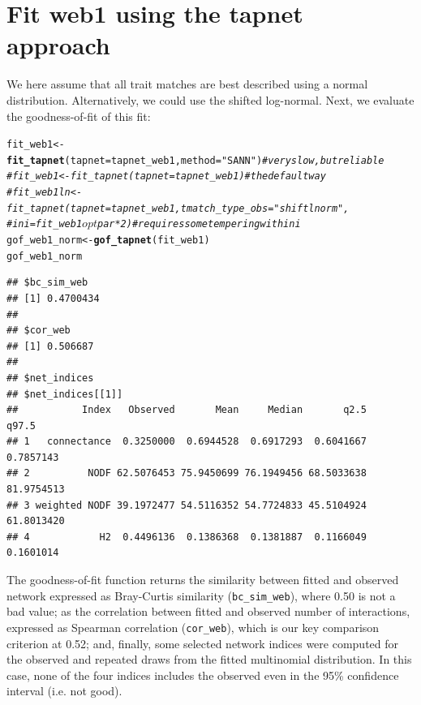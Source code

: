 \documentclass[a4paper, 11pt]{article}\usepackage[]{graphicx}\usepackage[]{color}
\makeatletter
\newcommand{\hlstr}[1]{\textcolor[rgb]{0.192,0.494,0.8}{#1}}%
\newcommand{\hlcom}[1]{\textcolor[rgb]{0.678,0.584,0.686}{\textit{#1}}}%
\newcommand{\hlstd}[1]{\textcolor[rgb]{0.345,0.345,0.345}{#1}}%
\newcommand{\hlkwb}[1]{\textcolor[rgb]{0.69,0.353,0.396}{#1}}%
\newcommand{\hlkwc}[1]{\textcolor[rgb]{0.333,0.667,0.333}{#1}}%
\newcommand{\hlkwd}[1]{\textcolor[rgb]{0.737,0.353,0.396}{\textbf{#1}}}%
\newenvironment{kframe}{%
 \def\at@end@of@kframe{}%
 \ifinner\ifhmode%
  \def\at@end@of@kframe{\end{minipage}}%
  \begin{minipage}{\columnwidth}%
 \fi\fi%
 \def\FrameCommand##1{\hskip\@totalleftmargin \hskip-\fboxsep
 \colorbox{shadecolor}{##1}\hskip-\fboxsep
     \hskip-\linewidth \hskip-\@totalleftmargin \hskip\columnwidth}%
 \MakeFramed {\advance\hsize-\width
   \@totalleftmargin\z@ \linewidth\hsize
   \@setminipage}}%
 {\par\unskip\endMakeFramed%
 \at@end@of@kframe}
\newenvironment{knitrout}{}{} %
\newcommand{\code}[1]{\texttt{#1}}
\makeatother
\begin{document}
\section{Fit web1 using the tapnet approach}
We here assume that all trait matches are best described using a normal distribution. Alternatively, we could use the shifted log-normal. Next, we evaluate the goodness-of-fit of this fit:
\begin{knitrout}\small
{}\color{fgcolor}\begin{kframe}
\begin{alltt}
\hlstd{fit_web1} \hlkwb{<-} \hlkwd{fit_tapnet}\hlstd{(}\hlkwc{tapnet} \hlstd{= tapnet_web1,} \hlkwc{method}\hlstd{=}\hlstr{"SANN"}\hlstd{)} \hlcom{# very slow, but reliable}
\hlcom{#fit_web1 <- fit_tapnet(tapnet = tapnet_web1) # the default way}
\hlcom{#fit_web1ln <- fit_tapnet(tapnet = tapnet_web1, tmatch_type_obs = "shiftlnorm", }
\hlcom{#                         ini=fit_web1$opt$par*2) # requires some tempering with ini}
\hlstd{gof_web1_norm} \hlkwb{<-} \hlkwd{gof_tapnet}\hlstd{(fit_web1)}
\hlstd{gof_web1_norm}
\end{alltt}
\begin{verbatim}
## $bc_sim_web
## [1] 0.4700434
## 
## $cor_web
## [1] 0.506687
## 
## $net_indices
## $net_indices[[1]]
##           Index   Observed       Mean     Median       q2.5      q97.5
## 1   connectance  0.3250000  0.6944528  0.6917293  0.6041667  0.7857143
## 2          NODF 62.5076453 75.9450699 76.1949456 68.5033638 81.9754513
## 3 weighted NODF 39.1972477 54.5116352 54.7724833 45.5104924 61.8013420
## 4            H2  0.4496136  0.1386368  0.1381887  0.1166049  0.1601014
\end{verbatim}
\end{kframe}
\end{knitrout}

The goodness-of-fit function returns the similarity between fitted and observed network expressed as Bray-Curtis similarity (\code{bc\_sim\_web}), where 0.50 is not a bad value; as the correlation between fitted and observed number of interactions, expressed as Spearman correlation (\code{cor\_web}), which is our key comparison criterion at 0.52; and, finally, some selected network indices were computed for the observed and repeated draws from the fitted multinomial distribution. In this case, none of the four indices includes the observed even in the 95\% confidence interval (i.e. not good).
\end{document}
